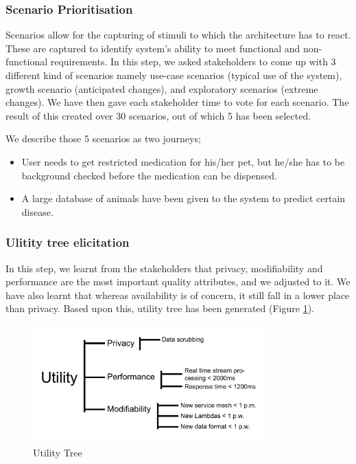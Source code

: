 \documentclass[conference]{IEEEtran}
\begin{document}
\subsubsection{Scenario Prioritisation}

Scenarios allow for the capturing of stimuli to which the architecture has to react. These are captured to identify system's ability to meet functional and non-functional requirements. In this step, we asked stakeholders to come up with 3 different kind of scenarios namely use-case scenarios (typical use of the system), growth scenario (anticipated changes), and exploratory scenarios (extreme changes). We have then gave each stakeholder time to vote for each scenario. The result of this created over 30 scenarios, out of which 5 has been selected.

We describe those 5 scenarios as two journeys;

\begin{itemize}
    \item User needs to get restricted medication for his/her pet, but he/she has to be background checked before the medication can be dispensed.
    \item A large database of animals have been given to the system to predict certain disease.
\end{itemize}

\subsubsection{Ulitity tree elicitation}

In this step, we learnt from the stakeholders that privacy, modifiability and performance are the most important quality attributes, and we adjusted to it. We have also learnt that whereas availability is of concern, it still fall in a lower place than privacy. Based upon this, utility tree has been generated (Figure \ref{UtilityFig}).


\begin{figure}[hbt!]
    \centering
    \includegraphics[width=9cm]{Utility Tree.pdf}
    \caption{Utility Tree} \label{UtilityFig}
\end{figure}
\end{document}
